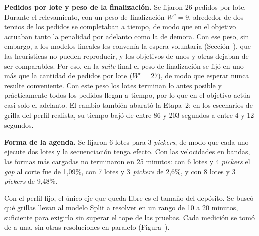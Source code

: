 {\bf Pedidos por lote y peso de la finalización.} Se fijaron 26 pedidos por
lote. Durante el relevamiento, con un peso de finalización $W^{c} = 9$,
alrededor de dos tercios de los pedidos se completaban a tiempo, de modo que
en el objetivo actuaban tanto la penalidad por adelanto como la de demora.
Con ese peso, sin embargo, a los modelos lineales les convenía la espera
voluntaria (Sección~), que las heurísticas no
pueden reproducir, y los objetivos de unos y otras dejaban de ser
comparables. Por eso, en la {\em suite} final el peso de finalización se fijó en
uno más que la cantidad de pedidos por lote ($W^{c} = 27$), de modo que
esperar nunca resulte conveniente. Con este peso los lotes terminan lo antes
posible y prácticamente todos los pedidos llegan a tiempo, por lo que en el
objetivo actúa casi solo el adelanto. El cambio también abarató la Etapa~2:
en los escenarios de grilla del perfil realista, su tiempo bajó de entre 86 y
203 segundos a entre 4 y 12 segundos.

{\bf Forma de la agenda.} Se fijaron 6 lotes para 3 {\em pickers}, de modo
que cada uno ejecute dos lotes y la secuenciación tenga efecto. Con las
velocidades en bandas, las formas más cargadas no terminaron en 25
minutos: con 6 lotes y 4 {\em pickers} el {\em gap} al corte fue de 1,09\%,
con 7 lotes y 3 {\em pickers} de 2,6\%, y con 8 lotes y 3 {\em pickers}
de 9,48\%.

\stopsection

\startsection[title={Hasta qué tamaño de depósito se obtienen resultados}]

Con el perfil fijo, el único eje que queda libre es el tamaño del depósito.
Se buscó qué grillas llevan al modelo Split a resolver en un rango de 10 a
20 minutos, suficiente para exigirlo sin superar el tope de las pruebas.
Cada medición se tomó de a una, sin otras resoluciones en paralelo
(Figura~).

